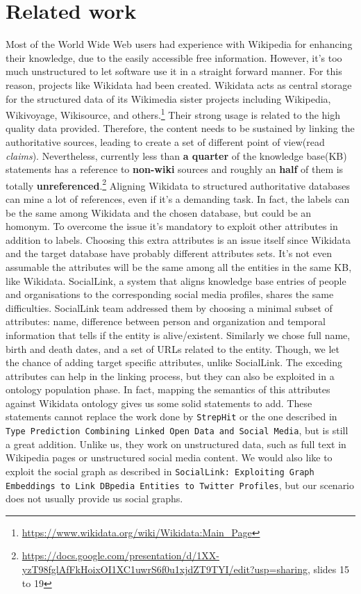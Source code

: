 \chapter{Related work}
\label{cha:1}
Most of the World Wide Web users had experience with Wikipedia for enhancing their knowledge, due to the easily accessible free information. However, it's too much unstructured to let software use it in a straight forward manner. For this reason, projects like Wikidata had been created. Wikidata acts as central storage for the structured data of its Wikimedia sister projects including Wikipedia, Wikivoyage, Wikisource, and others.\footnote{\url{https://www.wikidata.org/wiki/Wikidata:Main_Page}}
Their strong usage is related to the high quality data provided. Therefore, the content needs to be sustained by linking the authoritative sources, leading to create a set of different point of view(read \textit{claims}). Nevertheless, currently less than \textbf{a quarter} of the knowledge base(KB) statements has a reference to \textbf{non-wiki} sources and roughly an \textbf{half} of them is totally \textbf{unreferenced}.\footnote{\url{https://docs.google.com/presentation/d/1XX-yzT98fglAfFkHoixOI1XC1uwrS6f0u1xjdZT9TYI/edit?usp=sharing}, slides 15 to 19} Aligning Wikidata to structured authoritative databases can mine a lot of references, even if it's a demanding task. In fact, the labels can be the same among Wikidata and the chosen database, but could be an homonym. To overcome the issue it's mandatory to exploit other attributes in addition to labels. Choosing this extra attributes is an issue itself since Wikidata and the target database have probably different attributes sets. It's not even assumable the attributes will be the same among all the entities in the same KB, like Wikidata. SocialLink, a system that aligns knowledge base entries of people and organisations to the  corresponding social media profiles\cite{DBLP:conf/sac/NechaevCG17}, shares the same difficulties. SocialLink team addressed them by choosing a minimal subset of attributes: name, difference between person and organization and temporal information that tells if the entity is alive/existent. Similarly we chose full name, birth and death dates, and a set of URLs related to the entity. Though, we let the chance of adding target specific attributes, unlike SocialLink. The exceding attributes can help in the linking process, but they can also be exploited in a ontology population phase. In fact, mapping the semantics of this attributes against Wikidata ontology gives us some solid statements to add. These statements cannot replace the work done by \texttt{StrepHit}\cite{DBLP:journals/semweb/FossatiDG18} or the one described in \texttt{Type Prediction Combining Linked Open Data and Social Media}\cite{self:SocialLink/TypePrediction}, but is still a great addition. Unlike us, they work on unstructured data, such as full text in Wikipedia pages or unstructured social media content. We would also like to exploit the social graph as described in \texttt{SocialLink: Exploiting Graph Embeddings to Link DBpedia Entities to Twitter Profiles}\cite{self:SocialLink/Embeddings}, but our scenario does not usually provide us social graphs.

